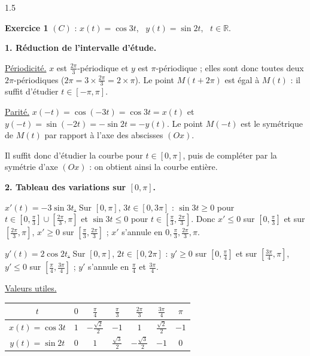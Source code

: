\documentclass[12pt]{article}
\begin{document}
\begin{spacing}{1.5}

\textbf{Exercice 1} \quad $(C)$ : $x(t)=\cos3t$, \ $y(t)=\sin2t$, \ $t\in\mathbb{R}$.

\textbf{1. Réduction de l'intervalle d'étude.}

\underline{Périodicité.} $x$ est $\frac{2\pi}{3}$-périodique et $y$ est $\pi$-périodique ; elles sont donc toutes deux $2\pi$-périodiques ($2\pi=3\times\frac{2\pi}3=2\times\pi$). Le point $M(t+2\pi)$ est égal à $M(t)$ : il suffit d'étudier $t\in[-\pi,\pi]$.

\underline{Parité.} $x(-t)=\cos(-3t)=\cos3t=x(t)$ et $y(-t)=\sin(-2t)=-\sin2t=-y(t)$. Le point $M(-t)$ est le symétrique de $M(t)$ par rapport à l'axe des abscisses $(Ox)$.

Il suffit donc d'étudier la courbe pour $t\in[0,\pi]$, puis de compléter par la symétrie d'axe $(Ox)$ : on obtient ainsi la courbe entière.

\textbf{2. Tableau des variations sur $[0,\pi]$.}

\underline{$x'(t)=-3\sin3t$.} Sur $[0,\pi]$, $3t\in[0,3\pi]$ : $\sin3t\ge0$ pour $t\in[0,\frac\pi3]\cup[\frac{2\pi}3,\pi]$ et $\sin3t\le0$ pour $t\in[\frac\pi3,\frac{2\pi}3]$. Donc $x'\le0$ sur $[0,\frac\pi3]$ et sur $[\frac{2\pi}3,\pi]$, $x'\ge0$ sur $[\frac\pi3,\frac{2\pi}3]$ ; $x'$ s'annule en $0,\frac\pi3,\frac{2\pi}3,\pi$.

\underline{$y'(t)=2\cos2t$.} Sur $[0,\pi]$, $2t\in[0,2\pi]$ : $y'\ge0$ sur $[0,\frac\pi4]$ et sur $[\frac{3\pi}4,\pi]$, $y'\le0$ sur $[\frac\pi4,\frac{3\pi}4]$ ; $y'$ s'annule en $\frac\pi4$ et $\frac{3\pi}4$.

\underline{Valeurs utiles.}
\begin{center}
\begin{tabular}{|c|c|c|c|c|c|c|}
\hline
$t$ & $0$ & $\frac\pi4$ & $\frac\pi3$ & $\frac{2\pi}3$ & $\frac{3\pi}4$ & $\pi$\\
\hline
$x(t)=\cos3t$ & $1$ & $-\frac{\sqrt2}2$ & $-1$ & $1$ & $\frac{\sqrt2}2$ & $-1$\\
\hline
$y(t)=\sin2t$ & $0$ & $1$ & $\frac{\sqrt3}2$ & $-\frac{\sqrt3}2$ & $-1$ & $0$\\
\hline
\end{tabular}
\end{center}

\begin{center}
\end{center}


\end{spacing}
\end{document}
